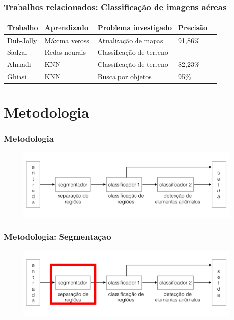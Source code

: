 \documentclass[t]{beamer}
\begin{document}
\begin{frame}[c]
	\frametitle{Trabalhos relacionados: Classificação de imagens aéreas}
	\small{
		\begin{table}[h]
		\centering
		\begin{tabulary}{\linewidth}{|L|L|L|L|C|}
		\hline
		\textbf{Trabalho} &  \textbf{Aprendizado} & \textbf{Problema investigado} &  \textbf{Precisão} \\ \hline
		Dub-Jolly & Máxima veross. & Atualização de mapas           & 91,86\% \\ \hline
		Sadgal    & Redes neurais          & Classificação de terreno       & -       \\ \hline
		Ahmadi    & KNN                    & Classificação de terreno       & 82,23\% \\ \hline
		Ghiasi    & KNN                    & Busca por objetos & 95\%    \\ \hline
		\end{tabulary}
		\end{table}
	}
\end{frame}


\section{Metodologia}

\begin{frame}[c]
	\frametitle{Metodologia}
	\begin{figure}[h]
    	\includegraphics[width=\textwidth]{imgs/arquitetura}
	\end{figure}
\end{frame}

\begin{frame}[c]
	\frametitle{Metodologia: Segmentação}
	\begin{figure}[h]
    	\includegraphics[width=\textwidth]{imgs/arquitetura_1}
	\end{figure}
\end{frame}
\end{document}
